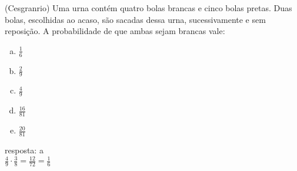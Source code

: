 \begin{ex}
 (Cesgranrio) Uma urna contém quatro bolas brancas e cinco bolas pretas. Duas bolas, escolhidas ao acaso, são sacadas dessa urna, sucessivamente e sem reposição. A probabilidade de que ambas sejam brancas vale:
    \begin{enumerate}[(a)]
    \item $\frac{1}{6}$
    \item $\frac{2}{9}$
    \item $\frac{4}{9}$
    \item $\frac{16}{81}$
    \item $\frac{20}{81}$
    \end{enumerate}
      \begin{sol}
        resposta: a \\
        $\frac{4}{9}\cdot\frac{3}{8}=\frac{12}{72} =\frac{1}{6}$
      \end{sol}
\end{ex}